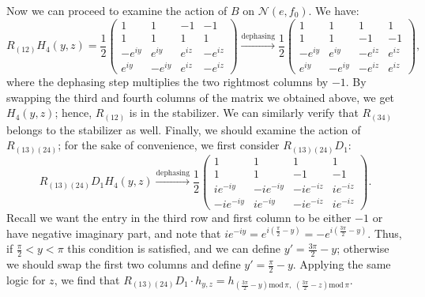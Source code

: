 \documentclass[referee,sn-mathphys-num]{sn-jnl}%
\theoremstyle{thmstyleone}%
\theoremstyle{thmstyletwo}%
\theoremstyle{remark}
\theoremstyle{thmstylethree}%
\begin{document}
Now we can proceed to examine the action of $B$ on $ \mathcal{N} \left( e, f_0 \right) $. We have:
\begin{equation}
	R_{\left( 1 2 \right)} H_4 \left( y, z \right) = \frac{1}{2} \begin{pmatrix}
		1 & 1 & -1 & -1 \\
		1 & 1 & 1 & 1 \\
		-e^{i y} & e^{i y} & e^{i z} & -e^{i z} \\
		e^{i y} & -e^{i y} & e^{i z} & -e^{i z}
	\end{pmatrix} \xrightarrow{\mathrm{dephasing}} \frac{1}{2} \begin{pmatrix}
	1 & 1 & 1 & 1 \\
	1 & 1 & -1 & -1 \\
	-e^{i y} & e^{i y} & -e^{i z} & e^{i z} \\
	e^{i y} & -e^{i y} & -e^{i z} & e^{i z}
\end{pmatrix} ,
\end{equation}
where the dephasing step multiplies the two rightmost columns by $-1$. By swapping the third and fourth columns of the matrix we obtained above, we get $ H_4 \left( y, z \right) $; hence, $ R_{\left( 1 2 \right)} $ is in the stabilizer. We can similarly verify that $ R_{\left( 3 4 \right)} $ belongs to the stabilizer as well. Finally, we should examine the action of $ R_{\left( 1 3 \right) \left( 2 4 \right)} $; for the sake of convenience, we first consider $ R_{\left( 1 3 \right) \left( 2 4 \right)} D_1 $:
\begin{equation}
	R_{\left( 1 3 \right) \left( 2 4 \right)} D_1 H_4 \left( y, z \right)  \xrightarrow{\mathrm{dephasing}} \frac{1}{2} \begin{pmatrix}
	1 & 1 & 1 & 1 \\
	1 & 1 & -1 & -1 \\
	i e^{-i y} & -i e^{-i y} & -i e^{-i z} & i e^{-i z} \\
	-i e^{-i y} & i e^{-i y} & -i e^{-i z} & i e^{-i z}
\end{pmatrix} .
\end{equation}
Recall we want the entry in the third row and first column to be either $-1$ or have negative imaginary part, and note that $ i e^{-i y} = e^{i \left( \frac{\pi}{2} -y \right)} = -e^{i \left( \frac{3\pi}{2} -y \right)} $. Thus, if $ \frac{\pi}{2} < y < \pi $ this condition is satisfied, and we can define $ y' = \frac{3\pi}{2} -y $; otherwise we should swap the first two columns and define $ y' = \frac{\pi}{2} -y $. Applying the same logic for $z$, we find that $ R_{\left( 1 3 \right) \left( 2 4 \right)} D_1 \cdot h_{y,z} = h_{ \left( \frac{3\pi}{2} -y \right) \mathrm{mod} \, \pi, \; \left( \frac{3\pi}{2} -z \right)   \mathrm{mod} \, \pi } $.
\end{document}
